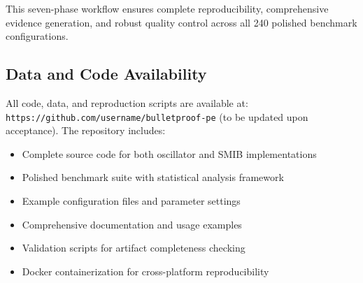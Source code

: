 \documentclass[conference]{IEEEtran}
\begin{document}
This seven-phase workflow ensures complete reproducibility, comprehensive evidence generation, and robust quality control across all 240 polished benchmark configurations.

\subsection{Data and Code Availability}
All code, data, and reproduction scripts are available at: \texttt{https://github.com/username/bulletproof-pe} (to be updated upon acceptance). The repository includes:
\begin{itemize}
\item Complete source code for both oscillator and SMIB implementations
\item Polished benchmark suite with statistical analysis framework
\item Example configuration files and parameter settings
\item Comprehensive documentation and usage examples
\item Validation scripts for artifact completeness checking
\item Docker containerization for cross-platform reproducibility
\end{itemize}
\end{document}
